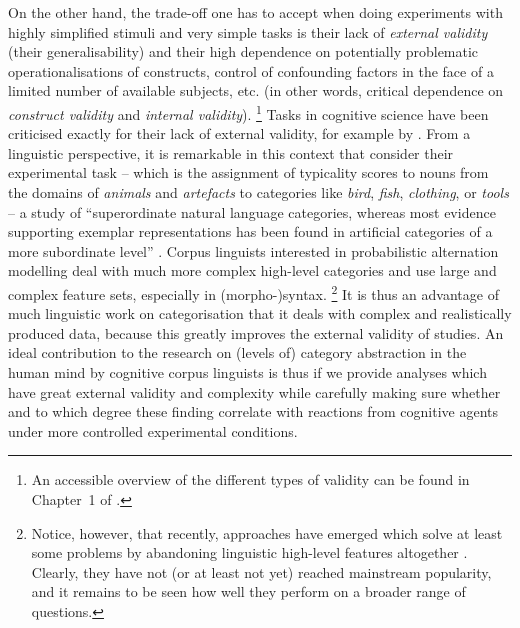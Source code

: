 On the other hand, the trade-off one has to accept when doing experiments with highly simplified stimuli and very simple tasks is their lack of \textit{external validity} (\ie their generalisability) and their high dependence on potentially problematic operationalisations of constructs, control of confounding factors in the face of a limited number of available subjects, etc. (in other words, critical dependence on \textit{construct validity} and \textit{internal validity}).%
\footnote{An accessible overview of the different types of validity can be found in Chapter~1 of \citet{MaxwellDelaney2004}.}
Tasks in cognitive science have been criticised exactly for their lack of external validity, for example by \citet{Murphy2003}.
From a linguistic perspective, it is remarkable in this context that \cite{VoorspoelsEa2011} consider their experimental task -- which is the assignment of typicality scores to nouns from the domains of \textit{animals} and \textit{artefacts} to categories like \textit{bird}, \textit{fish}, \textit{clothing}, or \textit{tools} -- a study of ``superordinate natural language categories, whereas most evidence supporting exemplar representations has been found in artificial categories of a more subordinate level'' \citep[1013]{VoorspoelsEa2011}.
Corpus linguists interested in probabilistic alternation modelling deal with much more complex high-level categories and use large and complex feature sets, especially in (morpho-)syntax.%
\footnote{Notice, however, that recently, approaches have emerged which solve at least some problems by abandoning linguistic high-level features altogether \citep{BaayenEa2016,RamscarPort2016}.
Clearly, they have not (or at least not yet) reached mainstream popularity, and it remains to be seen how well they perform on a broader range of questions.}
It is thus an advantage of much linguistic work on categorisation that it deals with complex and realistically produced data, because this greatly improves the external validity of studies.
An ideal contribution to the research on (levels of) category abstraction in the human mind by cognitive corpus linguists is thus if we provide analyses which have great external validity and complexity while carefully making sure whether and to which degree these finding correlate with reactions from cognitive agents under more controlled experimental conditions.

